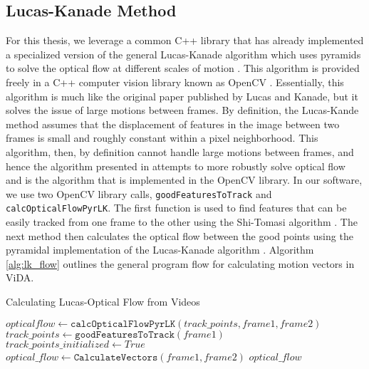 \subsection{\label{subsection:lucas_kanade} Lucas-Kanade Method} For this
thesis, we leverage a common C++ library that has already implemented a
specialized version of the general Lucas-Kanade algorithm which uses pyramids to
solve the optical flow at different scales of motion
\cite{bouguet2001pyramidal}. This algorithm is provided freely in a C++ computer
vision library known as OpenCV \cite{itseez2015opencv}. Essentially, this
algorithm is much like the original paper published by Lucas and Kanade, but it
solves the issue of large motions between frames. By definition, the Lucas-Kande
method assumes that the displacement of features in the image between two frames
is small and roughly constant within a pixel neighborhood. This algorithm, then,
by definition cannot handle large motions between frames, and hence the algorithm
presented in \cite{bouguet2001pyramidal} attempts to more robustly solve
optical flow and is the algorithm that is implemented in the OpenCV \cite{itseez2015opencv}
library. In our software, we use two OpenCV library calls, \texttt{goodFeaturesToTrack}
and \texttt{calcOpticalFlowPyrLK}. The first function is used to find features
that can be easily tracked from one frame to the other using the Shi-Tomasi
algorithm \cite{shi1994good}. The next method then calculates the optical flow
between the good points using the pyramidal implementation of the Lucas-Kanade
algorithm \cite{bouguet2001pyramidal}. Algorithm \ref{alg:lk_flow} outlines the general
program flow for calculating motion vectors in ViDA.

\begin{algorithm}
\caption{Calculating Lucas-Optical Flow from Videos}
\label{alg:lk_flow}
\begin{algorithmic}[1]
  	\State $opticalflow \gets \texttt{calcOpticalFlowPyrLK}(track\_points, frame1, frame2)$
  \Else
  	\State $track\_points \gets \texttt{goodFeaturesToTrack}(frame1)$
	\State $track\_points\_initialized \gets True$
	\State $optical\_flow \gets  \texttt{CalculateVectors}(frame1, frame2)$
  \EndIf
  \Return $optical\_flow$
\EndProcedure
\end{algorithmic}
\end{algorithm}

